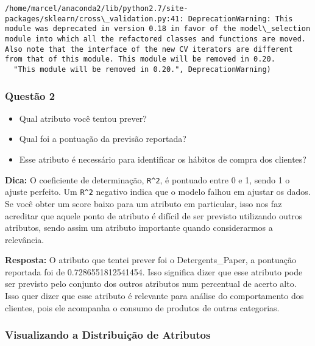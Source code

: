 \documentclass[11pt]{article}
\providecommand{\tightlist}{%
      \setlength{\itemsep}{0pt}\setlength{\parskip}{0pt}}
\begin{document}
    \begin{Verbatim}[commandchars=\\\{\}]
/home/marcel/anaconda2/lib/python2.7/site-packages/sklearn/cross\_validation.py:41: DeprecationWarning: This module was deprecated in version 0.18 in favor of the model\_selection module into which all the refactored classes and functions are moved. Also note that the interface of the new CV iterators are different from that of this module. This module will be removed in 0.20.
  "This module will be removed in 0.20.", DeprecationWarning)

    \end{Verbatim}

    \subsubsection{Questão 2}\label{questuxe3o-2}

\begin{itemize}
\tightlist
\item
  Qual atributo você tentou prever?
\item
  Qual foi a pontuação da previsão reportada?
\item
  Esse atributo é necessário para identificar os hábitos de compra dos
  clientes?
\end{itemize}

\textbf{Dica:} O coeficiente de determinação, \texttt{R\^{}2}, é
pontuado entre 0 e 1, sendo 1 o ajuste perfeito. Um \texttt{R\^{}2}
negativo indica que o modelo falhou em ajustar os dados. Se você obter
um score baixo para um atributo em particular, isso nos faz acreditar
que aquele ponto de atributo é difícil de ser previsto utilizando outros
atributos, sendo assim um atributo importante quando considerarmos a
relevância.

    \textbf{Resposta:} O atributo que tentei prever foi o Detergents\_Paper,
a pontuação reportada foi de 0.7286551812541454. Isso significa dizer
que esse atributo pode ser previsto pelo conjunto dos outros atributos
num percentual de acerto alto. Isso quer dizer que esse atributo é
relevante para análise do comportamento dos clientes, pois ele acompanha
o consumo de produtos de outras categorias.

    \subsubsection{Visualizando a Distribuição de
Atributos}\label{visualizando-a-distribuiuxe7uxe3o-de-atributos}
\end{document}
